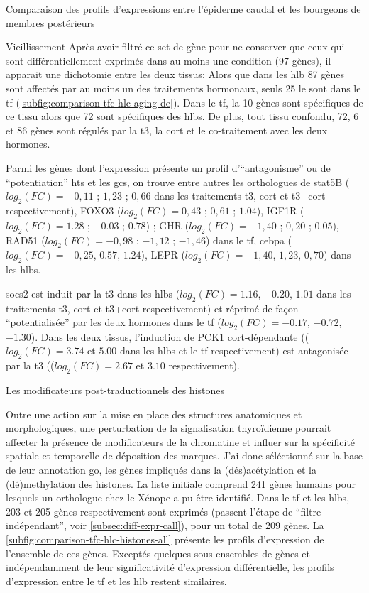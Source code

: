 \documentclass[../main.tex]{subfiles}
\begin{document}
\begin{chapter}{Comparaison des profils d'expressions entre l'épiderme caudal et les bourgeons de membres postérieurs}
\begin{section}{Vieillissement}
Après avoir filtré ce set de gène pour ne conserver que ceux qui sont différentiellement exprimés dans au moins une condition (97 gènes), il apparait une dichotomie entre les deux tissus:
Alors que dans les \gls{hlb} 87 gènes sont affectés par au moins un des traitements hormonaux, seuls 25 le sont dans le \gls{tf} (\autoref{subfig:comparison-tfc-hlc-aging-de}).
Dans le \gls{tf}, la 10 gènes sont spécifiques de ce tissu alors que 72 sont spécifiques des \glspl{hlb}. 
De plus, tout tissu confondu, 72, 6 et 86 gènes sont régulés par la \gls{t3}, la \gls{cort} et le co-traitement avec les deux hormones.
\par
Parmi les gènes dont l'expression présente un profil d'``antagonisme'' ou de ``potentiation'' \glspl{ht} et les \glspl{gc}, on trouve entre autres les orthologues de \gls{stat5}B ($log_2(FC)=-0,11$ ; $1,23$ ; $0,66$ dans les traitements \gls{t3}, \gls{cort} et \gls{t3}+\gls{cort} respectivement), FOXO3 ($log_2(FC)=0,43$ ; $0,61$ ; $1.04$), IGF1R ($log_2(FC)=1.28$ ; $-0.03$ ; $0.78$) ; GHR ($log_2(FC)=-1,40$ ; $0,20$ ; $0.05$), RAD51 ($log_2(FC)=-0,98$ ; $-1,12$ ; $-1,46$) dans le \gls{tf}, \gls{cebpa} ($log_2(FC)=-0,25$, $0.57$, $1.24$), LEPR ($log_2(FC)=-1,40$, $1,23$, $0,70$) dans les \glspl{hlb}.
\par
\gls{socs2} est induit par la \gls{t3} dans les \glspl{hlb} ($log_2(FC)=1.16$, $-0.20$, $1.01$ dans les traitements \gls{t3}, \gls{cort} et \gls{t3}+\gls{cort} respectivement) et réprimé de façon ``potentialisée'' par les deux hormones dans le \gls{tf} ($log_2(FC)=-0.17$, $-0.72$, $-1.30$).
Dans les deux tissus, l'induction de PCK1 \gls{cort}-dépendante (($log_2(FC)=3.74$ et $5.00$ dans les \glspl{hlb} et le \gls{tf} respectivement) est antagonisée par la \gls{t3} (($log_2(FC)=2.67$ et $3.10$ respectivement).

\end{section}


\begin{section}{Les modificateurs post-traductionnels des histones}\label{sec:res-histones}

Outre une action sur la mise en place des structures anatomiques et morphologiques, une perturbation de la signalisation thyroïdienne pourrait affecter la présence de modificateurs de la chromatine et influer sur la spécificité spatiale et temporelle de déposition des marques.
J'ai donc séléctionné sur la base de leur annotation \gls{go}, les gènes impliqués dans la (dés)acétylation et la (dé)methylation des histones.
La liste initiale comprend 241 gènes humains pour lesquels un orthologue chez le Xénope a pu être identifié.
Dans le \gls{tf} et les \glspl{hlb}, 203 et 205 gènes respectivement sont exprimés (passent l'étape de ``filtre indépendant'', voir \autoref{subsec:diff-expr-call}), pour un total de 209 gènes.
La \autoref{subfig:comparison-tfc-hlc-histones-all} présente les profils d'expression de l'ensemble de ces gènes.
Exceptés quelques sous ensembles de gènes et indépendamment de leur significativité d'expression différentielle, les profils d'expression entre le \gls{tf} et les \gls{hlb} restent similaires.


\end{section}
\end{chapter}
\end{document}
